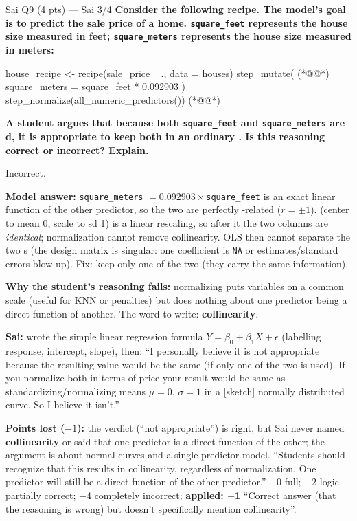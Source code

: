 \begin{qbox}{Sai Q9 (4 pts) --- Sai 3/4}
\textbf{Consider the following recipe. The model's goal is to predict the sale price of a home. \texttt{square\_feet} represents the house size measured in feet; \texttt{square\_meters} represents the house size measured in meters:}
\begin{rcode}
house_recipe <-
  recipe(sale_price ~ ., data = houses) %
  step_mutate(                                        (*@@*)
    square_meters = square_feet * 0.092903
  ) %
  step_normalize(all_numeric_predictors())            (*@@*)
\end{rcode}
\textbf{A student argues that because both \texttt{square\_feet} and \texttt{square\_meters} are d, it is appropriate to keep both in an ordinary . Is this reasoning correct or incorrect? Explain.}
\par\ans Incorrect.
\par\textbf{Model answer:} \texttt{square\_meters} $=0.092903\times$\texttt{square\_feet} is an exact linear function of the other predictor, so the two are perfectly -related ($r=\pm1$).  (center to mean 0, scale to sd 1) is a linear rescaling, so after it the two columns are \emph{identical}; normalization cannot remove collinearity. OLS then cannot separate the two s (the design matrix is singular: one coefficient is \texttt{NA} or estimates/standard errors blow up). Fix: keep only one of the two (they carry the same information). 
\par\textbf{Why the student's reasoning fails:} normalizing puts variables on a common scale (useful for KNN or penalties) but does nothing about one predictor being a direct function of another. The word to write: \textbf{collinearity}.
\par\textbf{\color{dblue}Sai:} wrote the simple linear regression formula $Y=\beta_0+\beta_1X+\epsilon$ (labelling response, intercept, slope), then: ``I personally believe it is not appropriate because the resulting value would be the same (if only one of the two is used). If you normalize both in terms of price your result would be same as standardizing/normalizing means $\mu=0$, $\sigma=1$ in a [sketch] normally distributed curve. So I believe it isn't.''
\par\textbf{Points lost ($-1$):} the verdict (``not appropriate'') is right, but Sai never named \textbf{collinearity} or said that one predictor is a direct function of the other; the argument is about normal curves and a single-predictor model. \grader ``Students should recognize that this results in collinearity, regardless of normalization. One predictor will still be a direct function of the other predictor.'' $-$0 full; $-$2 logic partially correct; $-$4 completely incorrect; \textbf{applied: $-$1} ``Correct answer (that the reasoning is wrong) but doesn't specifically mention collinearity''.
\end{qbox}
